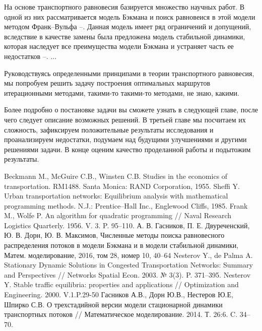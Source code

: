 \documentclass[12pt, a4paper]{article}
\begin{document}
	На основе транспортного равновесия базируется множество научных работ. В одной из них рассматривается модель Бэкмана и поиск равновеися в этой модели методом Франк–Вульфа \cite{litlink1}--\cite{litlink4}. Данная модель имеет ряд ограничений и допущений, вследствие в качестве замены была предложена модель стабильной динамики, которая наследует все преимущества модели Бэкмана и устраняет часть ее недостатков \cite{litlink5}--\cite{litlink7}. ...
	
	Руководствуясь определенными принципами в теории транспортного равновесия, мы попробуем решить задачу построения оптимальных маршрутов итерационными методами, такими-то такими-то методами, не знаю, какими. 
	
	Более подробно о постановке задачи вы сможете узнать в следующей главе, после чего следует описание возможных решений. В третьей главе мы посчитаем их сложность, зафиксируем положительные результаты исследования и проанализируем недостатки, подумаем над будущими улучшениями и другими решениями задачи. В конце оценим качество проделанной работы и подытожим результаты.
	
	
	\newpage
	
	
	\begin{thebibliography}{}
		  Beckmann M., McGuire C.B., Winsten C.B. Studies in the economics of transportation. RM1488. Santa Monica: RAND Corporation, 1955.
		  Sheffi Y. Urban transportation networks: Equilibrium analysis with mathematical programming methods. N.J.: Prentice–Hall Inc., Englewood Cliffs, 1985.
		  Frank M., Wolfe P. An algorithm for quadratic programming //
		Naval Research Logistics Quarterly. 1956. V. 3. P. 95–110.
		  А. В. Гасников, П. Е. Двуреченский, Ю. В. Дорн, Ю. В. Максимов, Численные методы поиска равновесного распределения потоков в модели Бэкмана и в модели стабильной динамики, Матем. моделирование, 2016, том 28, номер 10, 40–64
		 Nesterov Y., de Palma A. Stationary Dynamic Solutions in Congested Transportation Networks: Summary and Perspectives // Networks Spatial Econ. 2003. № 3(3). P. 371–395.
		 Nesterov Y. Stable traffic equilibria: properties and applications // Optimization and Engineering. 2000. V.1.P.29-50
		 Гасников А.В., Дорн Ю.В., Нестеров Ю.Е, Шпирко С.В. О трехстадийной версии модели
		стационарной динамики транспортных потоков // Математическое моделирование. 2014. Т. 26:6. C. 34–70.
	\end{thebibliography}
	
	
\end{document}
